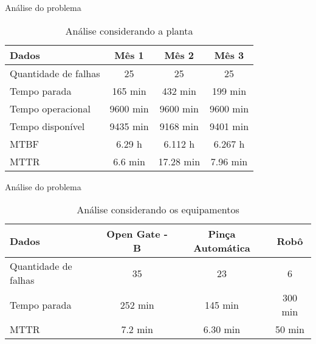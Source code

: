 \begin{frame}[c]{Análise do problema}
    \begin{table}[ht!]
        \centering
            \caption{Análise considerando a planta}
            \begin{tabular}{|l|c|c|c|} \hline
                \textbf{Dados}&\textbf{Mês 1}&\textbf{Mês 2}&\textbf{Mês 3}\\ \hline
                Quantidade de falhas & 25  & 25  & 25\\ \hline
                Tempo parada &  165 min  & 432 min  &  199 min\\ \hline
                Tempo operacional & 9600 min & 9600 min & 9600 min \\ \hline
                Tempo disponível & 9435 min  & 9168 min  & 9401 min\\ \hline
                MTBF  & 6.29 h  & 6.112 h &  6.267 h\\ \hline
                MTTR  & 6.6 min  & 17.28 min &  7.96 min\\ \hline
            \end{tabular}
        \end{table}
\end{frame}

\begin{frame}[c]{Análise do problema}
    \centering
        \begin{table}[ht!]
            \centering
                \caption{Análise considerando os equipamentos}
                \begin{tabular}{|l|c|c|c|} \hline
                    \textbf{Dados}&\textbf{Open Gate - B}&\textbf{Pinça Automática}&\textbf{Robô}\\ \hline
                    Quantidade de falhas & 35  & 23  & 6\\ \hline
                    Tempo parada &  252 min  & 145 min  &  300 min\\ \hline
                    MTTR  & 7.2 min  & 6.30 min &  50 min\\ \hline
                \end{tabular}
            \end{table}

\end{frame}
